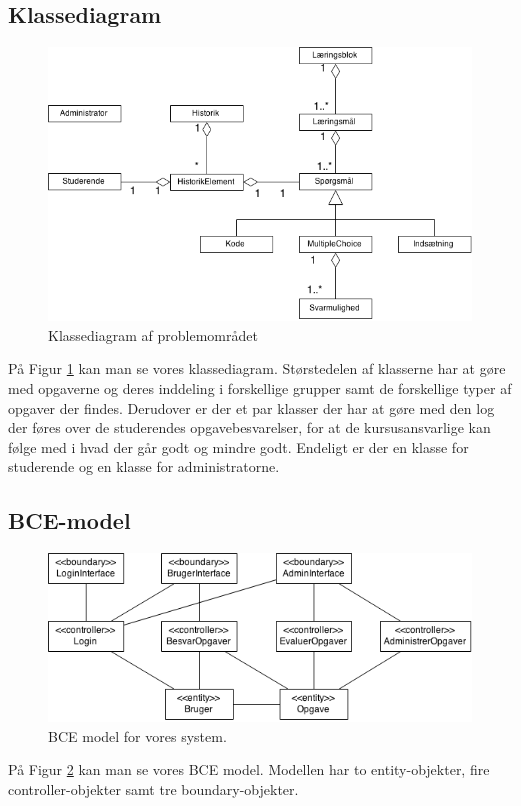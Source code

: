 \documentclass[12pt]{article}
\begin{document}
\subsection{Klassediagram}
\begin{figure}[htpb]
    \centering
    \includegraphics[width=0.8\linewidth]{figures/ClassDiagram.png}
    \caption{Klassediagram af problemområdet}
    \label{fig:class_diagram}
\end{figure}
På Figur \ref{fig:class_diagram} kan man se vores klassediagram. Størstedelen af klasserne har at gøre med opgaverne og deres inddeling i forskellige grupper samt de forskellige typer af opgaver der findes. Derudover er der et par klasser der har at gøre med den log der føres over de studerendes opgavebesvarelser, for at de kursusansvarlige kan følge med i hvad der går godt og mindre godt. Endeligt er der en klasse for studerende og en klasse for administratorne.

\subsection{BCE-model}
\begin{figure}[htpb]
  \centering
  \includegraphics[width=0.8\linewidth]{figures/BCE-Model.png}
  \caption{BCE model for vores system.}
  \label{fig:bce_model}
\end{figure}
På Figur \ref{fig:bce_model} kan man se vores BCE model. Modellen har to entity-objekter, fire controller-objekter samt tre boundary-objekter.
\end{document}
